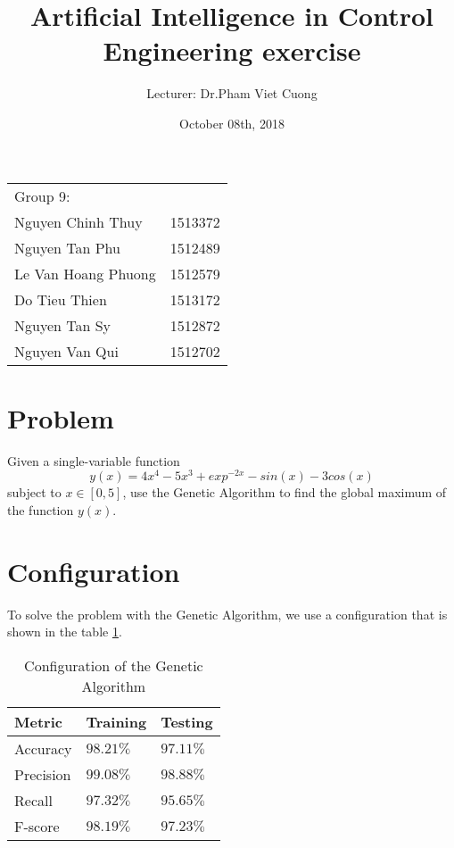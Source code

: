 \documentclass{article}
\title{Artificial Intelligence in Control Engineering exercise}
\author{
	Lecturer: Dr.Pham Viet Cuong	\\
}
\date{October 08th, 2018}
\begin{document}
\maketitle 					%

\begin{center}
	\begin{tabular}{l l}
	Group 9: \\
	Nguyen Chinh Thuy 	& 1513372	\\
	Nguyen Tan Phu		& 1512489	\\
	Le Van Hoang Phuong	& 1512579	\\
	Do Tieu Thien		& 1513172			\\
	Nguyen Tan Sy		& 1512872	\\
	Nguyen Van Qui		& 1512702
	\end{tabular}
\end{center}


\section{Problem}
Given a single-variable function
$$
y(x) = 4x^4 - 5x^3 + exp^{-2x} - sin(x) - 3cos(x)
$$
subject to $x \in [0, 5]$, use the Genetic Algorithm to find the global maximum of the function $y(x)$.


\section{Configuration}
To solve the problem with the Genetic Algorithm, we use a configuration that is shown in the table \ref{table:config}.

\begin{table}[!h]
\centering
\caption{Configuration of the Genetic Algorithm}
\label{table:config}
\begin{tabular}{|l|l|l|}
\hline
\textbf{Metric} & 	\textbf{Training}	&	\textbf{Testing}  	\\ \hline
	Accuracy 	&	$98.21\%$  			&	$97.11\%$ 			\\
	Precision 	&	$99.08\%$  			&	$98.88\%$ 			\\
	Recall 		&	$97.32\%$  			&	$95.65\%$ 			\\
	F-score 	&	$98.19\%$  			&	$97.23\%$ 			\\ \hline
\end{tabular}
\end{table}
\end{document}
